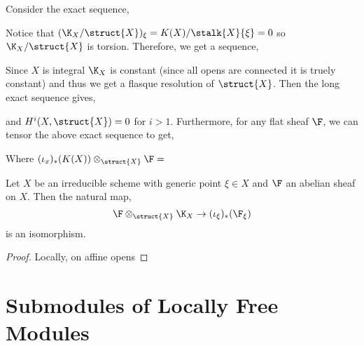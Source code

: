 \documentclass[12pt]{article}
\begin{document}
Consider the exact sequence,
\begin{center}
\end{center}
Notice that $(\K_X / \struct{X})_\xi = K(X) / \stalk{X}{\xi} = 0$ so $\K_X / \struct{X}$ is torsion. Therefore, we get a sequence,
\begin{center}
\end{center}
Since $X$ is integral $\K_X$ is constant (since all opens are connected it is truely constant) and thus we get a flasque resolution of $\struct{X}$. Then the long exact sequence gives,
\begin{center}
\end{center}
and $H^i(X, \struct{X}) = 0$ for $i > 1$. Furthermore, for any flat sheaf $\F$, we can tensor the above exact sequence to get,
\begin{center}
\end{center}
Where $(\iota_x)_*(K(X)) \otimes_{\struct{X}} \F = $ 

\begin{lemma}
Let $X$ be an irreducible scheme with generic point $\xi \in X$ and $\F$ an abelian sheaf on $X$. Then the natural map,
\[ \F \otimes_{\struct{X}} \K_X \to (\iota_\xi)_* (\F_\xi) \]
is an isomorphism.
\end{lemma}

\begin{proof}
Locally, on affine opens 
\end{proof}




\section{Submodules of Locally Free Modules}
\end{document}

